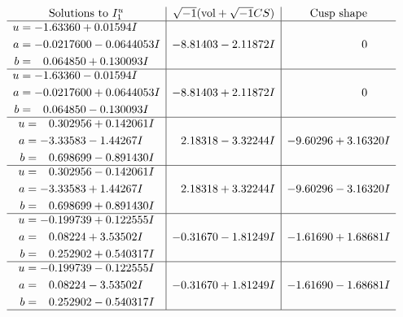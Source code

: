 \documentclass[1p]{elsarticle_modified}
\theoremstyle{definition}
\newcommand{\I}{\sqrt{-1}}
\begin{document}
$$\begin{array}{c|c|c}
\text{Solutions to }I^u_{1}& \I (\text{vol} + \sqrt{-1}CS) & \text{Cusp shape}\\
 \hline 
\begin{aligned}
u &= -1.63360 + 0.01594 I \\
a &= -0.0217600 - 0.0644053 I \\
b &= \phantom{-}0.064850 + 0.130093 I\end{aligned}
 & -8.81403 - 2.11872 I & \phantom{-0.000000 } 0 \\ \hline\begin{aligned}
u &= -1.63360 - 0.01594 I \\
a &= -0.0217600 + 0.0644053 I \\
b &= \phantom{-}0.064850 - 0.130093 I\end{aligned}
 & -8.81403 + 2.11872 I & \phantom{-0.000000 } 0 \\ \hline\begin{aligned}
u &= \phantom{-}0.302956 + 0.142061 I \\
a &= -3.33583 - 1.44267 I \\
b &= \phantom{-}0.698699 - 0.891430 I\end{aligned}
 & \phantom{-}2.18318 - 3.32244 I & -9.60296 + 3.16320 I \\ \hline\begin{aligned}
u &= \phantom{-}0.302956 - 0.142061 I \\
a &= -3.33583 + 1.44267 I \\
b &= \phantom{-}0.698699 + 0.891430 I\end{aligned}
 & \phantom{-}2.18318 + 3.32244 I & -9.60296 - 3.16320 I \\ \hline\begin{aligned}
u &= -0.199739 + 0.122555 I \\
a &= \phantom{-}0.08224 + 3.53502 I \\
b &= \phantom{-}0.252902 + 0.540317 I\end{aligned}
 & -0.31670 - 1.81249 I & -1.61690 + 1.68681 I \\ \hline\begin{aligned}
u &= -0.199739 - 0.122555 I \\
a &= \phantom{-}0.08224 - 3.53502 I \\
b &= \phantom{-}0.252902 - 0.540317 I\end{aligned}
 & -0.31670 + 1.81249 I & -1.61690 - 1.68681 I\\
 \hline 
 \end{array}$$\newpage\newpage\renewcommand{\arraystretch}{1}
\end{document}
